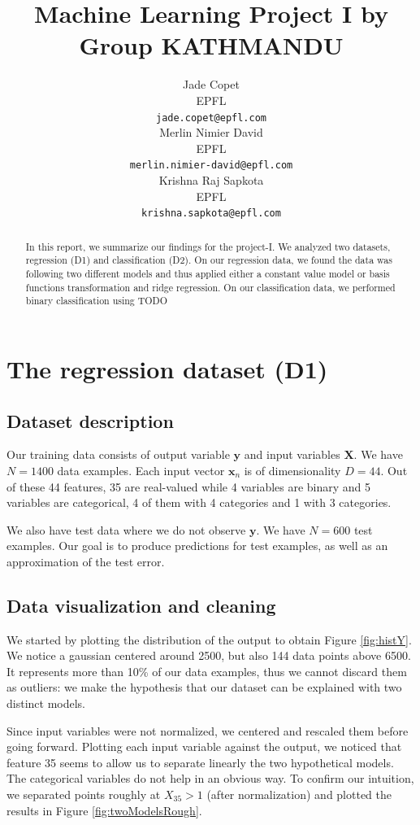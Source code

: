 \documentclass{article} %
\title{Machine Learning Project I by Group KATHMANDU}
\author{
Jade Copet\\
EPFL \\
\texttt{jade.copet@epfl.com} \\
\And
Merlin Nimier David\\
EPFL \\
\texttt{merlin.nimier-david@epfl.com} \\
\And
Krishna Raj Sapkota\\
EPFL \\
\texttt{krishna.sapkota@epfl.com} \\
}
\begin{document}
\maketitle



\begin{abstract}
  In this report, we summarize our findings for the project-I. We analyzed two datasets, regression (D1) and classification (D2). On our regression data, we found the data was following two different models and thus applied either a constant value model or basis functions transformation and ridge regression. On our classification data, we performed binary classification using TODO
\end{abstract}



\section{The regression dataset (D1)}

  \subsection{Dataset description}
  Our training data consists of output variable $\mathbf{y}$ and input variables $\mathbf{X}$. We have $N = 1400$ data examples. Each input vector $\mathbf{x}_n$ is of dimensionality $D = 44$. Out of these 44 features, 35 are real-valued while 4 variables are binary and 5 variables are categorical, 4 of them with 4 categories and 1 with 3 categories.

  We also have test data where we do not observe $\mathbf{y}$. We have $N = 600$ test examples. Our goal is to produce predictions for test examples, as well as an approximation of the test error.

  \subsection{Data visualization and cleaning}
  We started by plotting the distribution of the output to obtain Figure \ref{fig:histY}. We notice a gaussian centered around 2500, but also 144 data points above 6500. It represents more than 10\% of our data examples, thus we cannot discard them as outliers: we make the hypothesis that our dataset can be explained with two distinct models.

  Since input variables were not normalized, we centered and rescaled them before going forward. Plotting each input variable against the output, we noticed that feature 35 seems to allow us to separate linearly the two hypothetical models. The categorical variables do not help in an obvious way. To confirm our intuition, we separated points roughly at $X_{35} > 1$ (after normalization) and plotted the results in Figure \ref{fig:twoModelsRough}.
\end{document}
